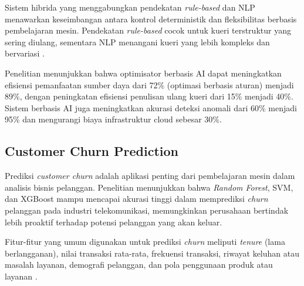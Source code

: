 Sistem hibrida yang menggabungkan pendekatan \textit{rule-based} dan NLP menawarkan keseimbangan antara kontrol deterministik dan fleksibilitas berbasis pembelajaran mesin. Pendekatan \textit{rule-based} cocok untuk kueri terstruktur yang sering diulang, sementara NLP menangani kueri yang lebih kompleks dan bervariasi \parencite{shah2024ai}.

Penelitian \textcite{shah2024ai} menunjukkan bahwa optimisator berbasis AI dapat meningkatkan efisiensi pemanfaatan sumber daya dari 72\% (optimasi berbasis aturan) menjadi 89\%, dengan peningkatan efisiensi penulisan ulang kueri dari 15\% menjadi 40\%. Sistem berbasis AI juga meningkatkan akurasi deteksi anomali dari 60\% menjadi 95\% dan mengurangi biaya infrastruktur cloud sebesar 30\%.

\subsection{Customer Churn Prediction}

Prediksi \textit{customer churn} adalah aplikasi penting dari pembelajaran mesin dalam analisis bisnis pelanggan. Penelitian \textcite{lalwani2022customer} menunjukkan bahwa \textit{Random Forest}, SVM, dan XGBoost mampu mencapai akurasi tinggi dalam memprediksi \textit{churn} pelanggan pada industri telekomunikasi, memungkinkan perusahaan bertindak lebih proaktif terhadap potensi pelanggan yang akan keluar.

Fitur-fitur yang umum digunakan untuk prediksi \textit{churn} meliputi \textit{tenure} (lama berlangganan), nilai transaksi rata-rata, frekuensi transaksi, riwayat keluhan atau masalah layanan, demografi pelanggan, dan pola penggunaan produk atau layanan \parencite{lalwani2022customer}.





